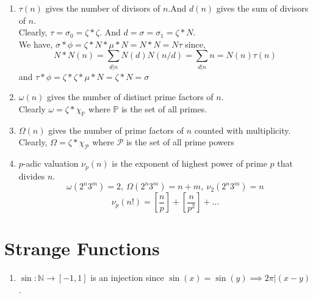 \begin{enumerate}
	\item $\tau(n)$ gives the number of divisors of $n$.And $d(n)$ gives the sum of divisors of $n$.\\
		Clearly, $\tau = \sigma_0 = \zeta \ast \zeta$. And $d = \sigma = \sigma_1 = \zeta \ast N$.\\
	We have, $\sigma \ast \phi = \zeta \ast N \ast \mu \ast N =  N \ast N = N \tau$ since,
		$$ N \ast N(n)= \sum_{d|n} N(d)N(n/d) = \sum_{d|n} n = N(n) \tau(n)$$
	and $\tau \ast \phi = \zeta \ast \zeta \ast \mu \ast N = \zeta \ast N = \sigma$
	\item $\omega(n)$ gives the number of distinct prime factors of $n$.\\
	Clearly $\omega = \zeta \ast \chi_\mathbb{P}$ where $\mathbb{P}$ is the set of all primes.
	\item $\Omega(n)$ gives the number of prime factors of $n$ counted with multiplicity.
	Clearly, $\Omega = \zeta \ast \chi_\mathcal{P}$ where $\mathcal{P}$ is the set of all prime powers 
	\item $p$-adic valuation $\nu_p(n)$ is the exponent of highest power of prime $p$ that divides $n$.
	$$ \omega(2^n3^m) = 2,\ \Omega(2^n 3^m)=n+m,\ \nu_2(2^n3^m)=n$$
	$$\nu_p(n!) = \left[\frac{n}{p}\right] + \left[\frac{n}{p^2}\right] + \dots$$
\end{enumerate}
\section{Strange Functions}
\begin{enumerate}
	\item $\sin : \mathbb{N} \to [-1,1]$ is an injection since $\sin (x) = \sin (y) \implies 2\pi | (x-y)$.
\end{enumerate}
